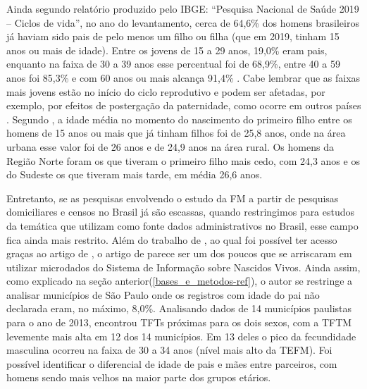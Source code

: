 Ainda segundo relatório produzido pelo IBGE: “Pesquisa Nacional de Saúde 2019 – Ciclos de vida”, no ano do levantamento, cerca de 64,6\% dos homens brasileiros já haviam sido pais de pelo menos um filho ou filha (que em 2019, tinham 15 anos ou mais de idade). Entre os jovens de 15 a 29 anos, 19,0\% eram pais, enquanto na faixa de 30 a 39 anos esse percentual foi de 68,9\%, entre 40 a 59 anos foi 85,3\% e com 60 anos ou mais alcança 91,4\% \cite{instituto2021pesquisa}. Cabe lembrar que as faixas mais jovens estão no início do ciclo reprodutivo e podem ser afetadas, por exemplo, por efeitos de postergação da paternidade, como ocorre em outros países \cite{kyzlinkova2018fatherhood, dudel2020unexplored}. Segundo , a idade média no momento do nascimento do primeiro filho entre os homens de 15 anos ou mais que já tinham filhos foi de 25,8 anos, onde na área urbana esse valor foi de 26 anos e de 24,9 anos na área rural. Os homens da Região Norte foram os que tiveram o primeiro filho mais cedo, com 24,3 anos e os do Sudeste os que tiveram mais tarde, em média 26,6 anos. 

\begin{comment}
    ESSE ARTIGO PODE SER MAIS EXPLORADO: \citeonline{wong2022fecundidade}

    DADOS DO RELATÓRIO: Pesquisa Nacional de Saúde (pns) 2019 – Ciclos de vida

    
    \cite{wong_male_nodate,franco_agora_nodate,de_carvalho_fecundidade_nodate, carvalho_apoio_2000, wong_fecundidade_nodate, falcao_fecundidade_2013, rutenberg_instituto_nodate, oliveira1999homens,siqueira_saue_2000, franco_os_nodate}

Scoppetta, O. Cambios en las trayectorias de fecundidad masculina en Córdoba, Colombia. Papeles de población, n. 15, v. 62, p. 173-199, 2009.

\end{comment}

Entretanto, se as pesquisas envolvendo o estudo da FM a partir de pesquisas domiciliares e censos no Brasil já são escassas, quando restringimos para estudos da temática que utilizam como fonte dados administrativos no Brasil, esse campo fica ainda mais restrito. Além do trabalho de , ao qual foi possível ter acesso graças ao artigo de \cite{wong2022fecundidade}, o artigo de  parece ser um dos poucos que se arriscaram em utilizar microdados do Sistema de Informação sobre Nascidos Vivos. Ainda assim, como explicado na seção anterior(\ref{bases_e_metodos-ref}), o autor se restringe a analisar municípios de São Paulo onde os registros com idade do pai não declarada eram, no máximo, 8,0\%. Analisando dados de 14 municípios paulistas para o ano de 2013, encontrou TFTs próximas para os dois sexos, com a TFTM levemente mais alta em 12 dos 14 municípios. Em 13 deles o pico da fecundidade masculina ocorreu na faixa de 30 a 34 anos (nível mais alto da TEFM). Foi possível identificar o diferencial de idade de pais e mães entre parceiros, com homens sendo mais velhos na maior parte dos grupos etários. 

